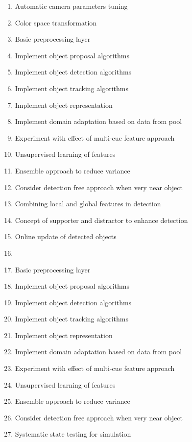 \begin{enumerate}
    \item Automatic camera parameters tuning
    \item Color space transformation 
    \item Basic preprocessing layer
    \item Implement object proposal algorithms
    \item Implement object detection algorithms
    \item Implement object tracking algorithms
    \item Implement object representation
    \item Implement domain adaptation based on data from pool
    \item Experiment with effect of multi-cue feature approach
    \item Unsupervised learning of features
    \item Ensemble approach to reduce variance
    \item Consider detection free approach when very near object
    \item Combining local and global features in detection
    \item Concept of supporter and distractor to enhance detection
    \item Online update of detected objects
    \item \item Basic preprocessing layer
    \item Implement object proposal algorithms
    \item Implement object detection algorithms
    \item Implement object tracking algorithms
    \item Implement object representation
    \item Implement domain adaptation based on data from pool
    \item Experiment with effect of multi-cue feature approach
    \item Unsupervised learning of features
    \item Ensemble approach to reduce variance
    \item Consider detection free approach when very near object
    \item Systematic state testing for simulation
\end{enumerate}
